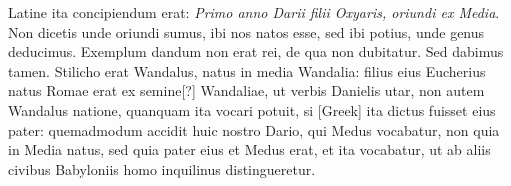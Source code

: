 Latine ita concipiendum erat: \textit{Primo anno Darii filii Oxyaris,
oriundi ex Media}.
Non dicetis unde oriundi sumus, ibi nos natos
esse, sed ibi potius, unde genus deducimus.
Exemplum dandum
non erat rei, de qua non dubitatur.
Sed dabimus tamen.
{}
Stilicho
erat Wandalus, natus in media Wandalia: filius eius Eucherius natus
Romae erat ex semine[?] Wandaliae, ut verbis Danielis utar, non autem
Wandalus natione, quanquam ita vocari potuit, si \textgreek{[Greek]}
ita dictus fuisset eius pater: quemadmodum accidit huic nostro
Dario, qui Medus vocabatur, non quia in Media natus, sed
quia pater eius et Medus erat, et ita vocabatur, ut ab aliis civibus
Babyloniis homo inquilinus distingueretur.

